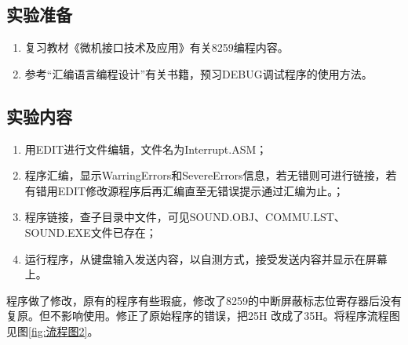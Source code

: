 \documentclass{ctexart}
\begin{document}
	\subsection{实验准备}%
	\label{sub:实验准备}

	\begin{enumerate}
		\item 复习教材《微机接口技术及应用》有关8259编程内容。
		\item 参考\enquote{汇编语言编程设计}有关书籍，预习DEBUG调试程序的使用方法。
	\end{enumerate}

	\subsection{实验内容}%
	\label{sub:实验内容}

	\begin{enumerate}
		\item 用EDIT进行文件编辑，文件名为Interrupt.ASM；
		\item 程序汇编，显示WarringErrors和SevereErrors信息，若无错则可进行链接，若有错用EDIT修改源程序后再汇编直至无错误提示通过汇编为止。；
		\item 程序链接，查子目录中文件，可见SOUND.OBJ、COMMU.LST、SOUND.EXE文件已存在；
		\item 运行程序，从键盘输入发送内容，以自测方式，接受发送内容并显示在屏幕上。
	\end{enumerate}


	程序做了修改，原有的程序有些瑕疵，修改了8259的中断屏蔽标志位寄存器后没有复原。但不影响使用。修正了原始程序的错误，把25H 改成了35H。将程序流程图见图\ref{fig:流程图2}。
\end{document}
